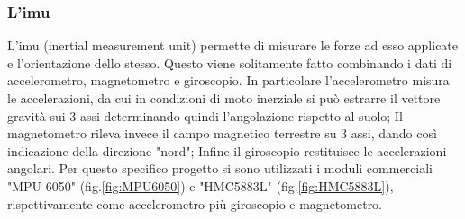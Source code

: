 \documentclass[10pt,a4paper]{article}
\begin{document}
\subsubsection{L'imu}
L'imu (inertial measurement unit) permette di misurare le forze ad esso applicate e l'orientazione dello stesso. Questo viene solitamente fatto combinando i dati di accelerometro, magnetometro e giroscopio. In particolare l'accelerometro misura le accelerazioni, da cui in condizioni di moto inerziale si pu\`o estrarre il vettore gravit\`a sui 3 assi determinando quindi l'angolazione rispetto al suolo; Il magnetometro rileva invece il campo magnetico terrestre su 3 assi, dando cos\`i indicazione della direzione "nord"; Infine il giroscopio restituisce le accelerazioni angolari.
Per questo specifico progetto si sono utilizzati i moduli commerciali "MPU-6050" (fig.\ref{fig:MPU6050}) e "HMC5883L" (fig.\ref{fig:HMC5883L}), rispettivamente come accelerometro pi\`u giroscopio e magnetometro. 
\end{document}
